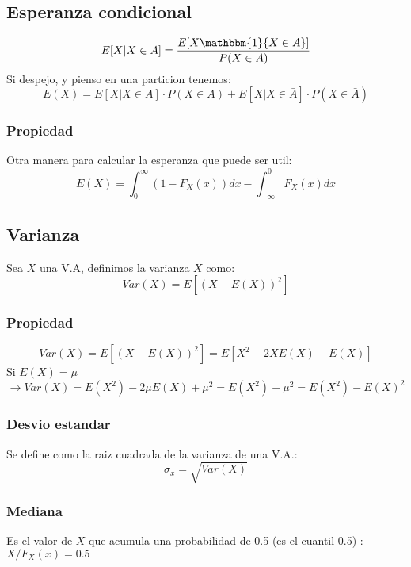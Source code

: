 \documentclass[titlepage,a4paper]{article}
\begin{document}
\subsection{Esperanza condicional}
\begin{equation*}
    E[X|X \in A] = \frac{E[X \mathbbm{1}\{X \in A\}]}{P(X \in A)}
\end{equation*}
Si despejo, y pienso en una particion tenemos:
\begin{equation*}
    E(X) = E[X|X \in A] \cdot P(X \in A) +  E[X|X \in \bar{A}] \cdot P(X \in \bar{A})
\end{equation*}
\subsubsection{Propiedad}
Otra manera para calcular la esperanza que puede ser util:
\begin{equation*}
    E(X) = \int_{0}^{\infty}(1-F_{X}(x))dx - \int_{-\infty}^{0}F_{X}(x)dx
\end{equation*}
\subsection{Varianza}
Sea $X$ una V.A, definimos la varianza $X$ como:
\begin{equation*}
    Var(X) = E[(X-E(X))^2]
\end{equation*}
\subsubsection{Propiedad}
\begin{equation*}
    Var(X) = E[(X-E(X))^2] = E[X^2 - 2XE(X)+ E(X)]
\end{equation*}
Si $E(X)= \mu$
\begin{equation*}
    \rightarrow Var(X) = E(X^2)-2\mu E(X) + \mu^2 = E(X^2)-\mu^2 = E(X^2)-E(X)^2
\end{equation*}
\subsubsection{Desvio estandar}
Se define como la raiz cuadrada de la varianza de una V.A.:
\begin{equation*}
    \sigma_{x} = \sqrt{Var(X)}
\end{equation*}
\subsubsection{Mediana}
Es el valor de $X$ que acumula una probabilidad de 0.5 (es el cuantil 0.5) : $X / F_{X}(x) = 0.5$
\end{document}
